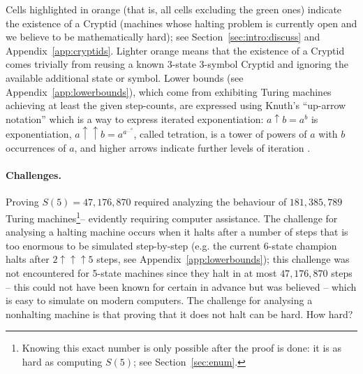 \documentclass[a4paper,british]{article}
\theoremstyle{definition} %
\numberwithin{equation}{section}
\theoremstyle{definition} %
\newcommand{\BBtheFifth}{47{,}176{,}870}
\newcommand{\BBtheFifthTNF}{181{,}385{,}789}
\begin{document}
\begin{table}[h]
{        Cells highlighted in orange (that is, all cells excluding the green ones) indicate the existence of a Cryptid (\ie machines whose halting problem is currently open and we believe to be mathematically hard); see Section~\ref{sec:intro:discuss} and Appendix~\ref{app:cryptids}. Lighter orange means that the existence of a Cryptid comes trivially from reusing a known 3-state 3-symbol Cryptid and ignoring the available additional state or symbol. Lower bounds (see Appendix~\ref{app:lowerbounds}), which come from exhibiting Turing machines achieving at least the given step-counts, are expressed using Knuth's ``up-arrow notation'' which is a way to express iterated exponentiation:
        $a \uparrow b = a^b$ is exponentiation,
        $a \uparrow\uparrow b = a^{a^{\dots^a}}$, called tetration, is a tower of powers of $a$ with $b$ occurrences of $a$,
        and higher arrows indicate further levels of iteration \cite{Knuth1976Coping}.
    }
    \label{table:landscape}
\end{table}

\vspace{-2ex}
\paragraph{Challenges.} Proving $S(5) = \BBtheFifth$ required analyzing the behaviour of $\BBtheFifthTNF$ Turing machines\footnote{Knowing this exact number is only possible after the proof is done: it is as hard as computing $S(5)$; see Section~\ref{sec:enum}.}-- evidently requiring computer assistance. The challenge for analysing a halting machine occurs when it halts after a number of steps that is too enormous to be simulated step-by-step (e.g. the current 6-state champion halts after $2 \uparrow \uparrow \uparrow 5$ steps, see Appendix~\ref{app:lowerbounds}); this challenge was not encountered for 5-state machines since they halt in at most $\BBtheFifth$ steps -- this could not have been known for certain in advance but was believed -- which is easy to simulate on modern computers. The challenge for analysing a nonhalting machine is that proving that it does not halt can be hard. How hard?
\end{document}

